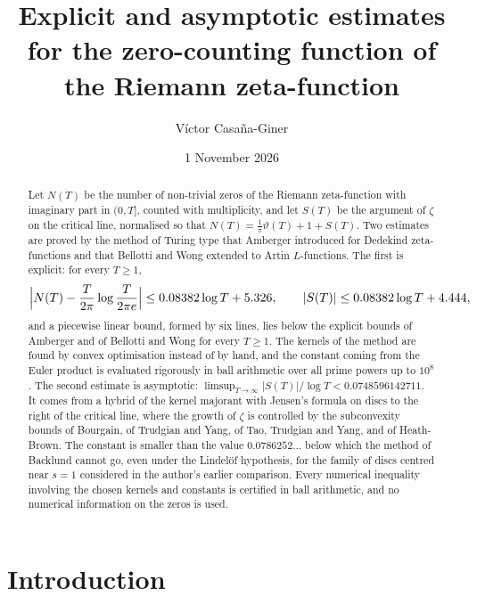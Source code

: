 \documentclass[11pt,reqno]{amsart}
\title[Explicit and asymptotic estimates for $N(T)$]{Explicit and asymptotic estimates for the zero-counting function of the Riemann zeta-function}
\author{V\'ictor Casa\~na-Giner}
\date{1 November 2026}
\numberwithin{equation}{section}
\theoremstyle{definition}
\theoremstyle{remark}
\newcommand{\LineBAone}{0.08382}
\newcommand{\LineBAthreeN}{5.326}
\newcommand{\LineBAthreeS}{4.444}
\newcommand{\CHup}{0.0748596142711}
\begin{document}
\begin{abstract}
Let $N(T)$ be the number of non-trivial zeros of the Riemann zeta-function with imaginary part in $(0,T]$, counted with multiplicity, and let $S(T)$ be the argument of $\zeta$ on the critical line, normalised so that $N(T)=\frac1\pi\vartheta(T)+1+S(T)$. Two estimates are proved by the method of Turing type that Amberger introduced for Dedekind zeta-functions and that Bellotti and Wong extended to Artin $L$-functions. The first is explicit: for every $T\ge1$,
\[
\Bigl|N(T)-\frac T{2\pi}\log\frac T{2\pi e}\Bigr|\le\LineBAone\log T+\LineBAthreeN,\qquad |S(T)|\le\LineBAone\log T+\LineBAthreeS,
\]
and a piecewise linear bound, formed by six lines, lies below the explicit bounds of Amberger and of Bellotti and Wong for every $T\ge1$. The kernels of the method are found by convex optimisation instead of by hand, and the constant coming from the Euler product is evaluated rigorously in ball arithmetic over all prime powers up to $10^8$. The second estimate is asymptotic: $\limsup_{T\to\infty}|S(T)|/\log T<\CHup$. It comes from a hybrid of the kernel majorant with Jensen's formula on discs to the right of the critical line, where the growth of $\zeta$ is controlled by the subconvexity bounds of Bourgain, of Trudgian and Yang, of Tao, Trudgian and Yang, and of Heath-Brown. The constant is smaller than the value $0.0786252\ldots$ below which the method of Backlund cannot go, even under the Lindel\"of hypothesis, for the family of discs centred near $s=1$ considered in the author's earlier comparison. Every numerical inequality involving the chosen kernels and constants is certified in ball arithmetic, and no numerical information on the zeros is used.
\end{abstract}

\maketitle
\tableofcontents

\section{Introduction}\label{sec:intro}
\end{document}
